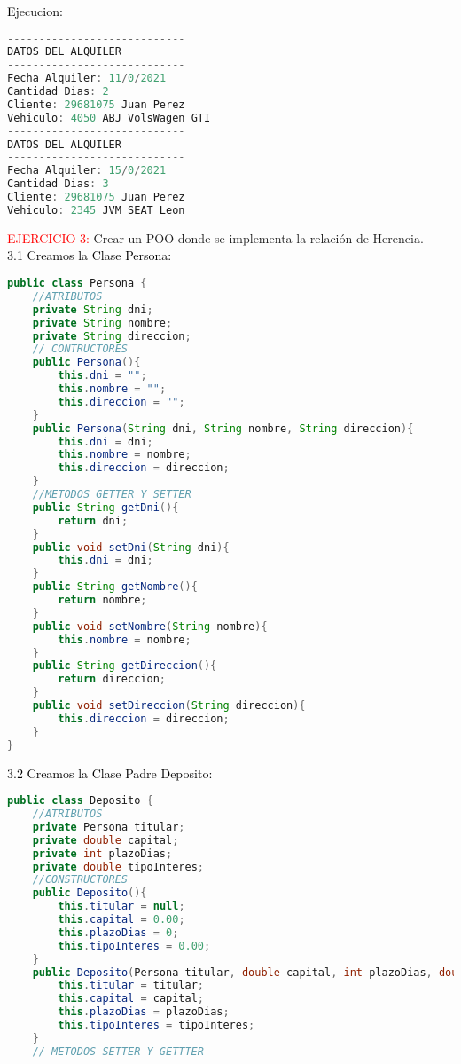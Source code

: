 \documentclass{article}
\begin{document}
\begin{itemize}
\begin{itemize}
\begin{lstlisting}[language=java]
        \end{lstlisting}
        \textcolor{black}{Ejecucion:}
        \begin{lstlisting}[language=java]
----------------------------
DATOS DEL ALQUILER
----------------------------
Fecha Alquiler: 11/0/2021
Cantidad Dias: 2
Cliente: 29681075 Juan Perez
Vehiculo: 4050 ABJ VolsWagen GTI
----------------------------
DATOS DEL ALQUILER
----------------------------
Fecha Alquiler: 15/0/2021
Cantidad Dias: 3
Cliente: 29681075 Juan Perez
Vehiculo: 2345 JVM SEAT Leon
        \end{lstlisting}
        \textcolor{red}{EJERCICIO 3:} Crear un POO donde se implementa la relación de Herencia.  
        \newline
        \\
        \textcolor{black}{3.1 Creamos la Clase Persona: }
        \begin{lstlisting}[language=java]
public class Persona {
    //ATRIBUTOS
    private String dni;
    private String nombre;
    private String direccion;
    // CONTRUCTORES
    public Persona(){
        this.dni = "";
        this.nombre = "";
        this.direccion = "";
    }
    public Persona(String dni, String nombre, String direccion){
        this.dni = dni;
        this.nombre = nombre;
        this.direccion = direccion;
    }
    //METODOS GETTER Y SETTER
    public String getDni(){
        return dni;
    }
    public void setDni(String dni){
        this.dni = dni;
    }
    public String getNombre(){
        return nombre;
    }
    public void setNombre(String nombre){
        this.nombre = nombre;
    }
    public String getDireccion(){
        return direccion;
    }
    public void setDireccion(String direccion){
        this.direccion = direccion;
    }
}
        \end{lstlisting}
        \textcolor{black}{3.2 Creamos la Clase Padre Deposito:}
        \begin{lstlisting}[language=java]
public class Deposito {
    //ATRIBUTOS
    private Persona titular;
    private double capital;
    private int plazoDias;
    private double tipoInteres;
    //CONSTRUCTORES
    public Deposito(){
        this.titular = null;
        this.capital = 0.00;
        this.plazoDias = 0;
        this.tipoInteres = 0.00;
    }
    public Deposito(Persona titular, double capital, int plazoDias, double tipoInteres){
        this.titular = titular;
        this.capital = capital;
        this.plazoDias = plazoDias;
        this.tipoInteres = tipoInteres;
    }
    // METODOS SETTER Y GETTTER

\end{lstlisting}
\end{itemize}
\end{itemize}
\end{document}
